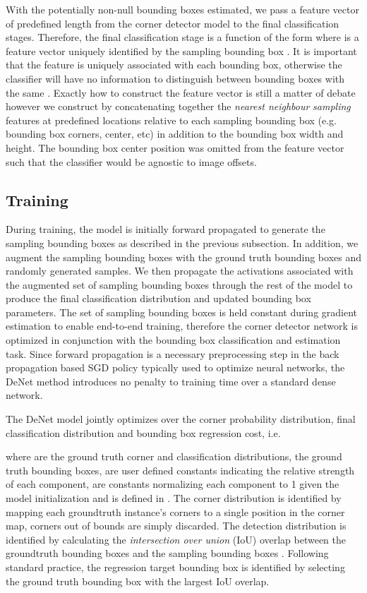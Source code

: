 \documentclass[10pt,twocolumn]{article}
\begin{document}
With the potentially non-null bounding boxes estimated, we pass a feature vector of predefined length from the corner detector model to the final classification stages. Therefore, the final classification stage is a function of the form  where  is a feature vector uniquely identified by the sampling bounding box .  It is important that the feature is uniquely associated with each bounding box, otherwise the classifier will have no information to distinguish between bounding boxes with the same . Exactly how to construct the feature vector is still a matter of debate\cite{r-fcn,faster-rcnn} however we construct  by concatenating together the \textit{nearest neighbour} \textit{sampling} features at predefined locations relative to each sampling bounding box (e.g. bounding box corners, center, etc) in addition to the bounding box width and height. The bounding box center position was omitted  from the feature vector such that the classifier would be agnostic to image offsets.




\subsection{Training}

During training, the model is initially forward propagated to generate the sampling bounding boxes  as described in the previous subsection. In addition, we augment the sampling bounding boxes with the ground truth bounding boxes and randomly generated samples. We then propagate the activations  associated with the augmented set of sampling bounding boxes through the rest of the model to produce the final classification distribution  and updated bounding box parameters. The set of sampling bounding boxes  is held constant during gradient estimation to enable end-to-end training, therefore the corner detector network is optimized in conjunction with the bounding box classification and estimation task. Since forward propagation is a necessary preprocessing step in the back propagation based SGD policy typically used to optimize neural networks, the DeNet method introduces no penalty to training time over a standard dense network. 

The DeNet model jointly optimizes over the corner probability distribution, final classification distribution and bounding box regression cost, i.e.



where  are the ground truth corner and classification distributions,  the ground truth bounding boxes,  are user defined constants indicating the relative strength of each component,  are constants normalizing each component to 1 given the model initialization and  is defined in \cite{fast-rcnn}. The corner distribution  is identified by mapping each groundtruth instance's corners to a single position in the corner map, corners out of bounds are simply discarded. The detection distribution  is identified by calculating the \textit{intersection over union} (IoU) overlap between the groundtruth bounding boxes and the sampling bounding boxes . Following standard practice, the regression target bounding box  is identified by selecting the ground truth bounding box with the largest IoU overlap. 
\end{document}
